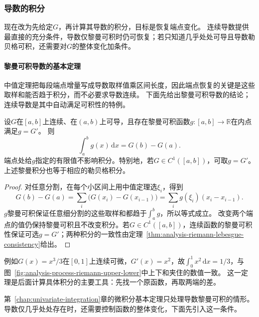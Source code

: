 \subsubsection{导数的积分}

现在改为先给定$G$，再计算其导数的积分，目标是恢复端点变化。
连续导数提供最直接的充分条件，导数仅黎曼可积时仍可恢复；若只知道几乎处处可导且导数勒贝格可积，还需要对$G$的整体变化加条件。

\paragraph{黎曼可积导数的基本定理}
中值定理把每段端点增量写成导数取样值乘区间长度，因此端点恢复的关键是这些取样和能否趋于积分，而不必要求导数连续。
下面先给出黎曼可积导数的结论；连续导数是其中自动满足可积性的特例。
\begin{theorem}[黎曼可积导数的端点公式]
\label{thm:analysis-riemann-derivative-ftc}
\label{thm:analysis-newton-leibniz-continuous}
设$G$在$[a,b]$上连续、在$(a,b)$上可导，且存在黎曼可积函数$g:[a,b]\to\mathbb R$在内点满足$g=G'$。
则
\[
 \int_a^bg(x)\,\mathrm dx=G(b)-G(a).
\]
端点处给$g$指定的有限值不影响积分。特别地，若$G\in C^1([a,b])$，可取$g=G'$。
上述黎曼积分也等于相应的勒贝格积分。
\end{theorem}
\begin{proof}
对任意分割，在每个小区间上用中值定理选$\xi_i$，得到
\[
 G(b)-G(a)=\sum_i\bigl(G(x_i)-G(x_{i-1})\bigr)
 =\sum_i g(\xi_i)(x_i-x_{i-1}).
\]
$g$黎曼可积保证任意细分割的这些取样和都趋于$\int_a^bg$，所以等式成立。
改变两个端点的值仍保持黎曼可积且不改变积分。若$G\in C^1([a,b])$，连续函数的黎曼可积性保证可选$g=G'$；两种积分的一致性由定理~\ref{thm:analysis-riemann-lebesgue-consistency}给出。
\end{proof}
例如$G(x)=x^3/3$在$[0,1]$上连续可微，$G'(x)=x^2$，故$\int_0^1x^2\,\mathrm dx=1/3$，与图~\ref{fig:analysis-process-riemann-upper-lower}中上下和夹住的数值一致。
这一定理是后面计算具体积分的主要工具：先找一个原函数，再取两端的差。

第~\ref{chap:univariate-integration}章的微积分基本定理只处理导数黎曼可积的情形。导数仅几乎处处存在时，还需要控制函数的整体变化，下面先引入这一条件。

